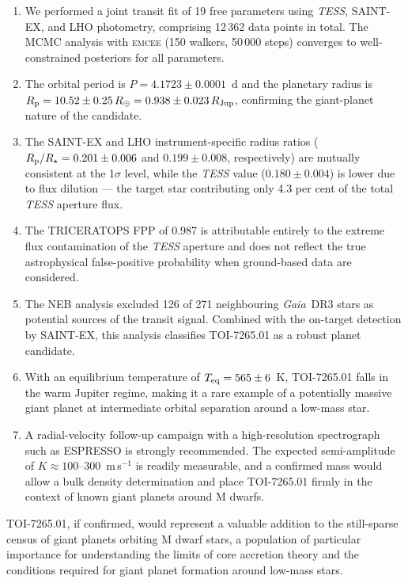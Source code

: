 \documentclass[fleqn,usenatbib]{mnras}
\newcommand{\Rjup}{R_{\rm Jup}}
\newcommand{\Rearth}{R_{\oplus}}
\newcommand{\rprs}{R_{\rm p}/R_{\star}}
\newcommand{\SAINTEX}{SAINT-EX}
\newcommand{\emcee}{\textsc{emcee}}
\newcommand{\triceratops}{\textsc{TRICERATOPS}}
\begin{document}
\begin{enumerate}
  \item We performed a joint transit fit of 19 free parameters using \textit{TESS}, \SAINTEX{}, and LHO photometry, comprising 12\,362 data points in total. The MCMC analysis with \emcee{} (150 walkers, 50\,000 steps) converges to well-constrained posteriors for all parameters.
  \item The orbital period is $P = 4.1723 \pm 0.0001$~d and the planetary radius is $R_{\rm p} = 10.52 \pm 0.25\,\Rearth = 0.938 \pm 0.023\,\Rjup$, confirming the giant-planet nature of the candidate.
  \item The \SAINTEX{} and LHO instrument-specific radius ratios ($\rprs = 0.201 \pm 0.006$ and $0.199 \pm 0.008$, respectively) are mutually consistent at the 1$\sigma$ level, while the \textit{TESS} value ($0.180 \pm 0.004$) is lower due to flux dilution — the target star contributing only 4.3 per cent of the total \textit{TESS} aperture flux.
  \item The \triceratops{} FPP of 0.987 is attributable entirely to the extreme flux contamination of the \textit{TESS} aperture and does not reflect the true astrophysical false-positive probability when ground-based data are considered.
  \item The NEB analysis excluded 126 of 271 neighbouring \textit{Gaia}~DR3 stars as potential sources of the transit signal. Combined with the on-target detection by \SAINTEX{}, this analysis classifies TOI-7265.01 as a robust planet candidate.
  \item With an equilibrium temperature of $T_{\rm eq} = 565 \pm 6$~K, TOI-7265.01 falls in the warm Jupiter regime, making it a rare example of a potentially massive giant planet at intermediate orbital separation around a low-mass star.
  \item A radial-velocity follow-up campaign with a high-resolution spectrograph such as ESPRESSO is strongly recommended. The expected semi-amplitude of $K \approx 100$--$300$~m\,s$^{-1}$ is readily measurable, and a confirmed mass would allow a bulk density determination and place TOI-7265.01 firmly in the context of known giant planets around M dwarfs.
\end{enumerate}

TOI-7265.01, if confirmed, would represent a valuable addition to the still-sparse census of giant planets orbiting M dwarf stars, a population of particular importance for understanding the limits of core accretion theory and the conditions required for giant planet formation around low-mass stars.
\end{document}

